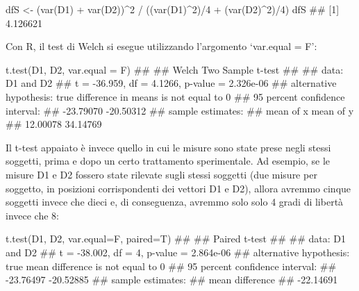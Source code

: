 \documentclass[a4paper,12pt,oneside]{book}
\newenvironment{Shaded}{\begin{snugshade}}{\end{snugshade}}
\newcommand{\DecValTok}[1]{#1}
\newcommand{\SpecialCharTok}[1]{#1}
\newcommand{\DocumentationTok}[1]{#1}
\newcommand{\OtherTok}[1]{#1}
\newcommand{\FunctionTok}[1]{#1}
\newcommand{\AttributeTok}[1]{#1}
\newcommand{\NormalTok}[1]{#1}
\begin{document}
\begin{Shaded}
\begin{Highlighting}[]
\NormalTok{dfS }\OtherTok{\textless{}{-}}\NormalTok{ (}\FunctionTok{var}\NormalTok{(D1) }\SpecialCharTok{+} \FunctionTok{var}\NormalTok{(D2))}\SpecialCharTok{\^{}}\DecValTok{2} \SpecialCharTok{/} 
\NormalTok{  ((}\FunctionTok{var}\NormalTok{(D1)}\SpecialCharTok{\^{}}\DecValTok{2}\NormalTok{)}\SpecialCharTok{/}\DecValTok{4} \SpecialCharTok{+}\NormalTok{ (}\FunctionTok{var}\NormalTok{(D2)}\SpecialCharTok{\^{}}\DecValTok{2}\NormalTok{)}\SpecialCharTok{/}\DecValTok{4}\NormalTok{)}
\NormalTok{dfS}
\DocumentationTok{\#\# [1] 4.126621}
\end{Highlighting}
\end{Shaded}

Con R, il test di Welch si esegue utilizzando l'argomento `var.equal = F':

\begin{Shaded}
\begin{Highlighting}[]
\FunctionTok{t.test}\NormalTok{(D1, D2, }\AttributeTok{var.equal =}\NormalTok{ F)}
\DocumentationTok{\#\# }
\DocumentationTok{\#\#  Welch Two Sample t{-}test}
\DocumentationTok{\#\# }
\DocumentationTok{\#\# data:  D1 and D2}
\DocumentationTok{\#\# t = {-}36.959, df = 4.1266, p{-}value = 2.326e{-}06}
\DocumentationTok{\#\# alternative hypothesis: true difference in means is not equal to 0}
\DocumentationTok{\#\# 95 percent confidence interval:}
\DocumentationTok{\#\#  {-}23.79070 {-}20.50312}
\DocumentationTok{\#\# sample estimates:}
\DocumentationTok{\#\# mean of x mean of y }
\DocumentationTok{\#\#  12.00078  34.14769}
\end{Highlighting}
\end{Shaded}

Il t-test appaiato è invece quello in cui le misure sono state prese negli stessi soggetti, prima e dopo un certo trattamento sperimentale. Ad esempio, se le misure D1 e D2 fossero state rilevate sugli stessi soggetti (due misure per soggetto, in posizioni corrispondenti dei vettori D1 e D2), allora avremmo cinque soggetti invece che dieci e, di conseguenza, avremmo solo solo 4 gradi di libertà invece che 8:

\begin{Shaded}
\begin{Highlighting}[]
\FunctionTok{t.test}\NormalTok{(D1, D2, }\AttributeTok{var.equal=}\NormalTok{F, }\AttributeTok{paired=}\NormalTok{T)}
\DocumentationTok{\#\# }
\DocumentationTok{\#\#  Paired t{-}test}
\DocumentationTok{\#\# }
\DocumentationTok{\#\# data:  D1 and D2}
\DocumentationTok{\#\# t = {-}38.002, df = 4, p{-}value = 2.864e{-}06}
\DocumentationTok{\#\# alternative hypothesis: true mean difference is not equal to 0}
\DocumentationTok{\#\# 95 percent confidence interval:}
\DocumentationTok{\#\#  {-}23.76497 {-}20.52885}
\DocumentationTok{\#\# sample estimates:}
\DocumentationTok{\#\# mean difference }
\DocumentationTok{\#\#       {-}22.14691}
\end{Highlighting}
\end{Shaded}
\end{document}
